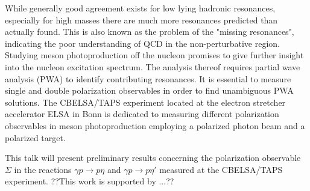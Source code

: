 \documentclass{scdpg}
\begin{document}
\begin{scAbstract}
{}
\scBeginText
While generally good agreement exists for low lying hadronic resonances, especially for high masses there are much more resonances predicted than actually found. This is also known as the problem of the "missing resonances", indicating the poor understanding of QCD in the non-perturbative region. Studying meson photoproduction off the nucleon promises to give further insight into the nucleon excitation spectrum. The analysis thereof requires partial wave analysis (PWA) to identify contributing resonances. It is essential to measure single and double polarization observables in order to find unambiguous PWA solutions. The CBELSA/TAPS experiment located at the electron stretcher accelerator ELSA in Bonn is dedicated to measuring different polarization observables in meson photoproduction employing a polarized photon beam and a polarized target. 

This talk will present preliminary results concerning the polarization observable $\Sigma$ in the reactions $\gamma p \to p \eta$ and $\gamma p \to p \eta'$ measured at the CBELSA/TAPS experiment. ??This work is supported by ...??
\scEndText
{}

\end{scAbstract}
\end{document}

